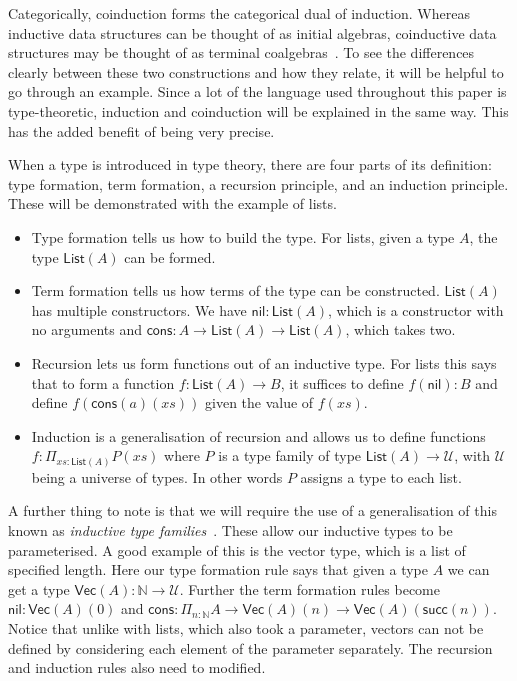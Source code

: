 \documentclass[draft]{article}
\begin{document}
Categorically, coinduction forms the categorical dual of induction.
Whereas inductive data structures can be thought of as initial
algebras, coinductive data structures may be thought of as terminal
coalgebras~\cite{jacobs1997tutorial}. To see the differences clearly
between these two constructions and how they relate, it will be
helpful to go through an example. Since a lot of the language used
throughout this paper is type-theoretic, induction and coinduction
will be explained in the same way. This has the added benefit of being
very precise.

When a type is introduced in type theory, there are four parts of its
definition: type formation, term formation, a recursion principle, and
an induction principle. These will be demonstrated with the example of
lists.
\begin{itemize}
\item Type formation tells us how to build the type. For lists, given
  a type \(A\), the type \(\mathsf{List}(A)\) can be formed.
\item Term formation tells us how terms of the type can be
  constructed. \(\mathsf{List}(A)\) has multiple constructors. We have
  \(\mathsf{nil} : \mathsf{List}(A)\), which is a constructor with no
  arguments and \(\mathsf{cons} : A \to \mathsf{List}(A) \to
  \mathsf{List}(A)\), which takes two.
\item Recursion lets us form functions out of an inductive type. For
  lists this says that to form a function \(f : \mathsf{List}(A) \to
  B\), it suffices to define \(f(\mathsf{nil}) : B\) and define
  \(f(\mathsf{cons}(a)(xs))\) given the value of \(f(xs)\).
\item Induction is a generalisation of recursion and allows us to
  define functions \(f : \Pi_{xs : \mathsf{List}(A)} P(xs)\) where
  \(P\) is a type family of type \(\mathsf{List}(A) \to \mathcal{U}\),
  with \(\mathcal{U}\) being a universe of types. In other words \(P\)
  assigns a type to each list.
\end{itemize}

A further thing to note is that we will require the use of a
generalisation of this known as \emph{inductive type
  families}~\cite[Section 5.7]{hottbook}. These allow our inductive
types to be parameterised. A good example of this is the vector type,
which is a list of specified length. Here our type formation rule says
that given a type \(A\) we can get a type \(\mathsf{Vec}(A) :
\mathbb{N} \to \mathcal{U}\). Further the term formation rules become
\(\mathsf{nil} : \mathsf{Vec}(A)(0)\) and \(\mathsf{cons} : \Pi_{n :
  \mathbb{N}} A \to \mathsf{Vec}(A)(n) \to
\mathsf{Vec}(A)(\mathsf{succ}(n))\). Notice that unlike with lists,
which also took a parameter, vectors can not be defined by considering
each element of the parameter separately. The recursion and induction
rules also need to modified.
\end{document}
